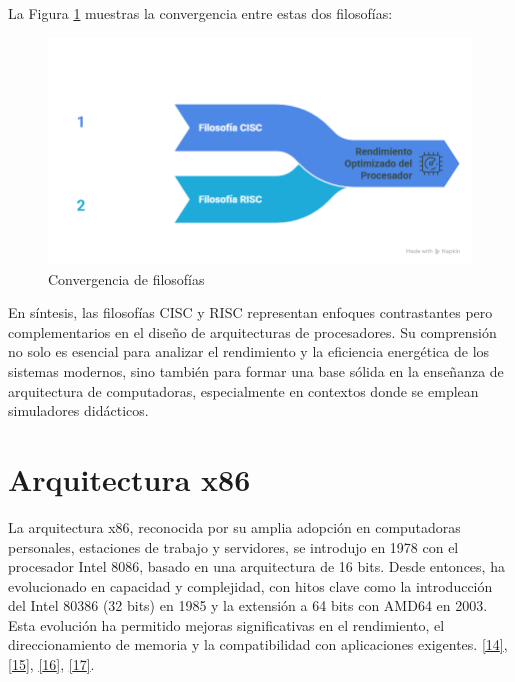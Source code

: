 \documentclass[12pt,oneside]{templates/unerthesis}
\begin{document}
La Figura \ref{fig:convergen} muestras la convergencia entre estas dos filosofías:

\begin{figure}

{\centering \includegraphics[width=1\linewidth]{images/convergen} 

}

\caption{Convergencia de filosofías}\label{fig:convergen}
\end{figure}

En síntesis, las filosofías CISC y RISC representan enfoques contrastantes pero complementarios en el diseño de arquitecturas de procesadores. Su comprensión no solo es esencial para analizar el rendimiento y la eficiencia energética de los sistemas modernos, sino también para formar una base sólida en la enseñanza de arquitectura de computadoras, especialmente en contextos donde se emplean simuladores didácticos.

\hypertarget{arquitectura-x86-1}{%
\section{Arquitectura x86}\label{arquitectura-x86-1}}

La arquitectura x86, reconocida por su amplia adopción en computadoras personales, estaciones de trabajo y servidores, se introdujo en 1978 con el procesador Intel 8086, basado en una arquitectura de 16 bits. Desde entonces, ha evolucionado en capacidad y complejidad, con hitos clave como la introducción del Intel 80386 (32 bits) en 1985 y la extensión a 64 bits con AMD64 en 2003. Esta evolución ha permitido mejoras significativas en el rendimiento, el direccionamiento de memoria y la compatibilidad con aplicaciones exigentes. \protect\hyperlink{ref-stallings_computer_2021}{{[}14{]}}, \protect\hyperlink{ref-intel_64_2025}{{[}15{]}}, \protect\hyperlink{ref-amd_developer_2024}{{[}16{]}}, \protect\hyperlink{ref-abel_ibm_2000}{{[}17{]}}.
\end{document}
